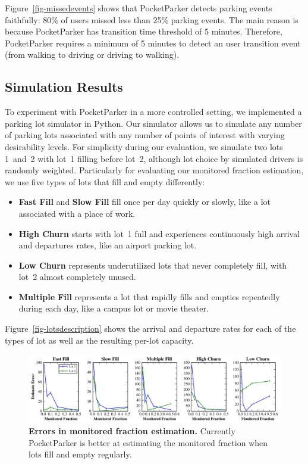 Figure~\ref{fig-missedevents} shows that PocketParker detects parking events 
faithfully: 80\% of users missed less than 25\% parking events. The main reason 
is because PocketParker has transition time threshold of 5 minutes. Therefore, 
PocketParker requires a minimum of 5 minutes to detect an user transition event
(from walking to driving or driving to walking). 

\subsection{Simulation Results}
\label{subsec-simulator}

To experiment with PocketParker in a more controlled setting, we implemented
a parking lot simulator in Python. Our simulator allows us to simulate any
number of parking lots associated with any number of points of interest with
varying desirability levels. For simplicity during our evaluation, we
simulate two lots 1~and~2 with lot~1 filling before lot~2, although lot
choice by simulated drivers is randomly weighted. Particularly for evaluating
our monitored fraction estimation, we use five types of lots that fill and
empty differently:

\begin{itemize}

\item \textbf{Fast Fill} and \textbf{Slow Fill} fill once per day quickly or
slowly, like a lot associated with a place of work.

\item \textbf{High Churn} starts with lot~1 full and experiences continuously
high arrival and departures rates, like an airport parking lot.

\item \textbf{Low Churn} represents underutilized lots that never completely
fill, with lot~2 almost completely unused.

\item \textbf{Multiple Fill} represents a lot that rapidly fills and empties
repeatedly during each day, like a campus lot or movie theater.

\end{itemize}

Figure~\ref{fig-lotsdescription} shows the arrival and departure rates for
each of the types of lot as well as the resulting per-lot capacity.

\begin{figure}
\centering
\includegraphics[width=\textwidth]{./simulator/figures/capacity_experiment.pdf}

\caption{\textbf{Errors in monitored fraction estimation.} Currently
PocketParker is better at estimating the monitored fraction when lots fill
and empty regularly.}

\label{fig-capacityerrors}
\end{figure}

